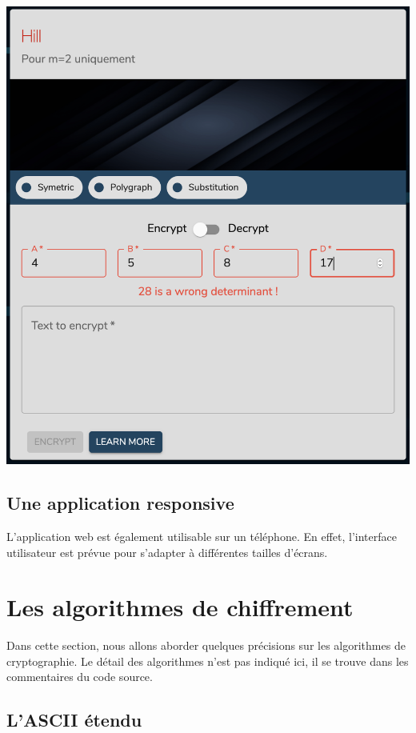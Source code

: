 \documentclass{article}
\begin{document}
\begin{center}
  \includegraphics[scale=0.4]{error.png}
\end{center}
\bigskip

\subsection{Une application responsive}
L'application web est également utilisable sur un téléphone. En effet, l'interface utilisateur est prévue pour s'adapter à différentes tailles d'écrans.


\section{Les algorithmes de chiffrement}

Dans cette section, nous allons aborder quelques précisions sur les algorithmes de cryptographie. Le détail des algorithmes n'est pas indiqué ici, il se trouve dans les commentaires du code source.

\subsection{L'ASCII étendu}
\end{document}
